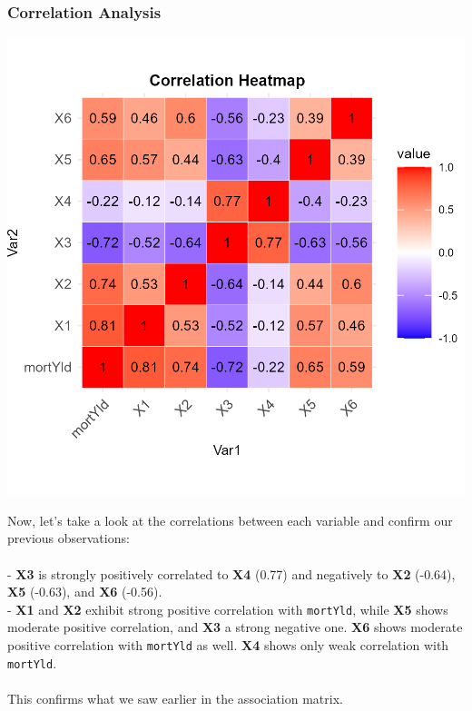 \documentclass[
  11pt,
]{article}
\begin{document}
\subsubsection{Correlation Analysis}\label{correlation-analysis}

\begin{minipage}{0.45\textwidth}
\includegraphics[width=\linewidth]{correlation_heatmap.png}
\end{minipage}
\hfill
\begin{minipage}{0.5\textwidth}
\vspace{0.5em}
\small
Now, let's take a look at the correlations between each variable and confirm our previous observations: \\
\\
- \textbf{X3} is strongly positively correlated to \textbf{X4} (0.77) and negatively to \textbf{X2} (-0.64), \textbf{X5} (-0.63), and \textbf{X6} (-0.56).\\
- \textbf{X1} and \textbf{X2} exhibit strong positive correlation with \texttt{mortYld}, while \textbf{X5} shows moderate positive correlation, and \textbf{X3} a strong negative one. \textbf{X6} shows moderate positive correlation with \texttt{mortYld} as well. \textbf{X4} shows only weak correlation with \texttt{mortYld}.\\
\\
This confirms what we saw earlier in the association matrix.
\end{minipage}
\end{document}
